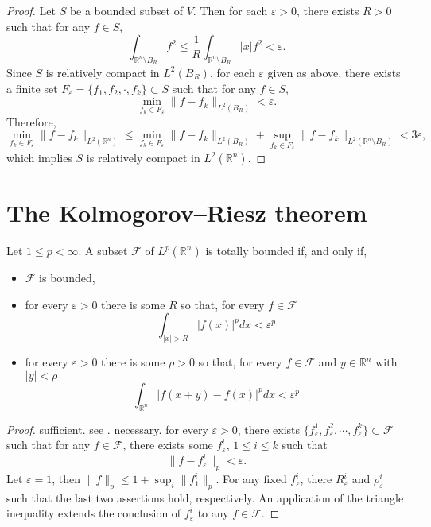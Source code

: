 \begin{proof}
	Let $S$ be a bounded subset of $V$.
	Then for each $\varepsilon>0$, there exists $R>0$ such that 
	for any $f\in S$,
	\[
	\int_{\mathbb{R}^n\setminus B_R}f^2 \leq \frac1R\int_{\mathbb{R}^n\setminus B_R}|x|f^2<\varepsilon.
	\]
	Since $S$ is relatively compact in $L^2(B_R)$, 
	for each $\varepsilon$ given as above,
	there exists a finite set $F_\varepsilon = \{f_1, f_2, \cdot, f_k\}\subset S$ such that 
	for any $f\in S$, 
	\[
	\min_{f_k\in F_\varepsilon}\|f-f_k\|_{L^2(B_R)}< \varepsilon.
	\] 
	Therefore,
	\[
	\min_{f_k\in F_\varepsilon}\|f-f_k\|_{L^{2}(\mathbb R^n)}
	\leq \min_{f_k\in F_\varepsilon}\|f-f_k\|_{L^{2}(B_R)}
		+ \sup_{f_k\in F_\varepsilon}\|f-f_k\|_{L^{2}(\mathbb R^n\setminus B_R)} 
		< 3\varepsilon,
	\]
	which implies $S$ is relatively compact in $L^2(\mathbb R^n)$.
\end{proof}

\section{The Kolmogorov–Riesz theorem}
\begin{theorem}
	 Let $1 \leq p<\infty .$ A subset $\mathcal{F}$ of $L^{p}\left(\mathbb{R}^{n}\right)$ is totally bounded if, and only if,
	 \begin{itemize}
	 	\item $\mathcal{F}$ is bounded,
	 	\item for every $\varepsilon>0$ there is some $R$ so that, for every $f \in \mathcal{F}$
	 	$$
	 	\int_{|x|>R}|f(x)|^{p} d x<\varepsilon^{p}
	 	$$
	 	\item for every $\varepsilon>0$ there is some $\rho>0$ so that, for every $f \in \mathcal{F}$ and $y \in \mathbb{R}^{n}$ with $|y|<\rho$
	 	$$
	 	\int_{\mathbb{R}^{n}}|f(x+y)-f(x)|^{p} d x<\varepsilon^{p}
	 	$$	
	 \end{itemize}
\end{theorem}

\begin{proof}
	sufficient. 
	see \cite{Hanche-Olsen2010}.
	necessary.
	for every $\varepsilon>0$, 
	there exists $\{f_\varepsilon^1, f_\varepsilon^2, \cdots, f_\varepsilon^k\}\subset\mathcal{F}$ such that 
	for any $f\in\mathcal{F}$, 
	there exists some $f_\varepsilon^i$, $1\leq i \leq k$ such that 
	\[
	\|f-f_\varepsilon^i\|_p < \varepsilon.
	\]
	Let $\varepsilon=1$, then $\|f\|_p\leq1+\sup_i\|f_1^i\|_p$.
	For any fixed $f_\varepsilon^i$, there $R_\varepsilon^i$ and $\rho_\varepsilon^i$ such that the last two assertions hold, respectively. An application of the triangle inequality extends the conclusion of $f_\varepsilon^i$ to any $f\in\mathcal{F}$.
\end{proof}
